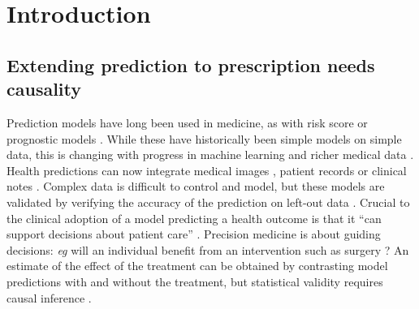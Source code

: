 \documentclass[11pt]{article}
\let\cite=\supercite
\begin{document}
\doublespacing
\section{Introduction}\label{sec:intro}

\subsection{Extending prediction to prescription needs causality}

Prediction models have long been used in medicine, as with risk
score or prognostic models \cite{moons2009prognosis,steyerberg2019clinical}.
While these have historically been simple models on simple data, this is
changing with progress in machine learning and richer medical data
\cite{beam2018big,rajkomar2019machine}. Health predictions can now integrate medical images
\cite{khojaste2022deep,zhang2019radiological,yala2019deep,shen2019deep,nassif2022breast},
patient records
\cite{mooney2018bigdata,desai2020comparison,simon2018predicting} or clinical
notes \cite{horng2017creating,wang2020prediction,spasic2020clinical}.
Complex data is difficult to control and model, but these models are
validated by verifying the accuracy of the prediction on left-out data
\cite{altman2009prognosis,poldrack2020establishment,varoquaux2022evaluating}.
Crucial to the clinical adoption of a model predicting a health outcome
is that it ``can support decisions about patient care''
\cite{wyatt1995commentary}. Precision medicine is about
guiding decisions: \emph{eg} will an individual benefit from an intervention such as surgery
\cite{fontana2019can}? An estimate of the effect of the treatment can be
obtained by contrasting model predictions with and without the treatment,
but statistical validity requires causal inference
\cite{snowden_implementation_2011,sperrin2019explicit,blakely2020reflection}.

\end{document}

